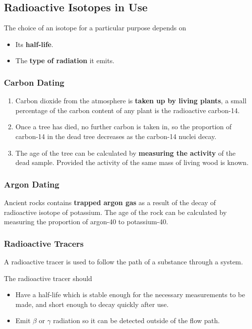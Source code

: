 \subsection{Radioactive Isotopes in Use}

The choice of an isotope for a particular purpose depends on
\begin{itemize}
    \item Its \textbf{half-life}.
    \item The \textbf{type of radiation} it emits.
\end{itemize}

\subsubsection*{Carbon Dating}

\begin{enumerate}
    \item Carbon dioxide from the atmosphere is \textbf{taken up by living plants}, a small percentage of the carbon content of any plant is the radioactive carbon-14.
    \item Once a tree has died, no further carbon is taken in, so the proportion of carbon-14 in the dead tree decreases as the carbon-14 nuclei decay.
    \item The age of the tree can be calculated by \textbf{measuring the activity} of the dead sample. Provided the activity of the same mass of living wood is known.
\end{enumerate}

\subsubsection*{Argon Dating}

Ancient rocks contains \textbf{trapped argon gas} as a result of the decay of radioactive isotope of potassium. The age of the rock can be calculated by measuring the proportion of argon-40 to potassium-40.

\subsubsection*{Radioactive Tracers}

A radioactive tracer is used to follow the path of a substance through a system.

The radioactive tracer should
\begin{itemize}
    \item Have a half-life which is stable enough for the necessary measurements to be made, and short enough to decay quickly after use.
    \item Emit $\beta$ or $\gamma$ radiation so it can be detected outside of the flow path.
\end{itemize}
